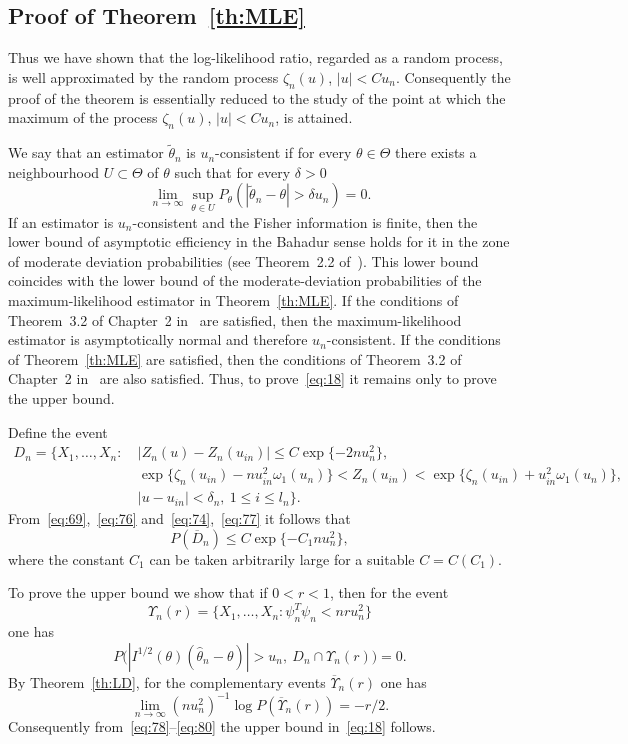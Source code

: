 \documentclass[11pt,a4paper]{article}
\begin{document}
\subsection{Proof of Theorem~\ref{th:MLE}}
\label{sub:MLE}

Thus we have shown that the log-likelihood ratio, regarded as a random process, is well approximated by the random process $\zeta_n(u)$, $|u|<Cu_n$. Consequently the proof of the theorem is essentially reduced to the study of the point at which the maximum of the process $\zeta_n(u)$, $|u|<Cu_n$, is attained.

We say that an estimator $\tilde\theta_n$ is $u_n$-consistent if for every $\theta\in\Theta$ there exists a neighbourhood $U\subset\Theta$ of $\theta$ such that for every $\delta>0$
\[
\lim_{n\to\infty}\sup_{\theta\in U}P_\theta(|\tilde\theta_n-\theta|>\delta u_n)=0.
\]
If an estimator is $u_n$-consistent and the Fisher information is finite, then the lower bound of asymptotic efficiency in the Bahadur sense holds for it in the zone of moderate deviation probabilities (see Theorem~2.2 of~\cite{5}). This lower bound coincides with the lower bound of the moderate-deviation probabilities of the maximum-likelihood estimator in Theorem~\ref{th:MLE}. If the conditions of Theorem~3.2 of Chapter~2 in~\cite{10} are satisfied, then the maximum-likelihood estimator is asymptotically normal and therefore $u_n$-consistent. If the conditions of Theorem~\ref{th:MLE} are satisfied, then the conditions of Theorem~3.2 of Chapter~2 in~\cite{10} are also satisfied. Thus, to prove~\eqref{eq:18} it remains only to prove the upper bound.

Define the event
\begin{align*}
D_n=\bigl\{X_1,\dots,X_n:&\ |Z_n(u)-Z_n(u_{in})|\le C\exp\{-2nu_n^2\},\\
&\ \exp\{\zeta_n(u_{in})-nu_{in}^2\omega_1(u_n)\}<Z_n(u_{in})<\exp\{\zeta_n(u_{in})+u_{in}^2\omega_1(u_n)\},\\
&\ |u-u_{in}|<\delta_n,\ 1\le i\le l_n\bigr\}.
\end{align*}
From~\eqref{eq:69},~\eqref{eq:76} and~\eqref{eq:74},~\eqref{eq:77} it follows that
\begin{equation}
P(\overline{D}_n)\le C\exp\{-C_1 nu_n^2\},
\label{eq:78}
\end{equation}
where the constant $C_1$ can be taken arbitrarily large for a suitable $C=C(C_1)$.

To prove the upper bound we show that if $0<r<1$, then for the event
\[
\Upsilon_n(r)=\{X_1,\dots,X_n:\psi_n^T\psi_n<nr u_n^2\}
\]
one has
\begin{equation}
P\bigl(|I^{1/2}(\theta)(\hat\theta_n-\theta)|>u_n,\ D_n\cap\Upsilon_n(r)\bigr)=0.
\label{eq:79}
\end{equation}
By Theorem~\ref{th:LD}, for the complementary events $\overline{\Upsilon}_n(r)$ one has
\begin{equation}
\lim_{n\to\infty}(nu_n^2)^{-1}\log P(\overline{\Upsilon}_n(r))=-r/2.
\label{eq:80}
\end{equation}
Consequently from~\eqref{eq:78}--\eqref{eq:80} the upper bound in~\eqref{eq:18} follows.
\end{document}
